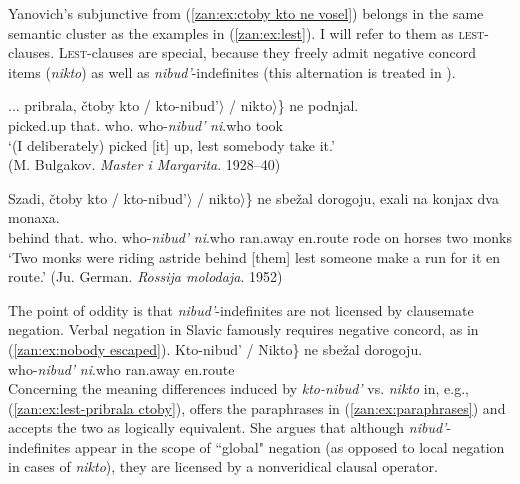 \documentclass[output=paper,colorlinks,citecolor=brown]{langscibook}
\begin{document}
Yanovich's subjunctive from (\ref{zan:ex:ctoby kto ne vosel}) belongs in the same semantic cluster as the examples in (\ref{zan:ex:lest}). I will refer to them as \textsc{lest}-clauses. \textsc{Lest}-clauses are special, because they freely admit negative concord items (\textit{nikto}) as well as \textit{nibud'}-inde\-finites (this alternation is treated in \citealt{paducheva2016}).


\ea \label{zan:ex:lest}
\ea \label{zan:ex:lest-pribrala ctoby}
 \gll ... pribrala,	čtoby	\minsp{\{} kto	 / \minsp{$\langle$}  kto-nibud'$\rangle$ / \minsp{$\langle$}  nikto$\rangle$\} ne	podnjal.  \\
       {}	picked.up	that.{\SBJV} {} who.{\INDF} {} {} {} who-\textit{nibud'} {} {} {} \textit{ni}.who	{\NEG}	took \\
        \glt `(I deliberately) picked [it] up, lest somebody take it.'\\ \hfill {(M. Bulgakov. \textit{Master i Margarita}. 1928--40)}
 
  \ex
  \gll 	Szadi,	čtoby	\minsp{\{} kto / \minsp{$\langle$}  kto-nibud'$\rangle$ / \minsp{$\langle$}  nikto$\rangle$\}	ne	sbežal	dorogoju,	exali	na	konjax dva	monaxa.  \\
        behind	that.{\SBJV} {}	who.{\INDF} {} {} {} who-\textit{nibud'} {} {} {} \textit{ni}.who	{\NEG}	ran.away	en.route	rode	on	horses
two	monks \\
        \glt `Two monks were riding astride behind [them] lest someone make a run for it en route.' \hfill {(Ju. German. \textit{Rossija molodaja}. 1952)}
       
\z\z

\noindent The point of oddity is that \textit{nibud'}-indefinites are not licensed by clausemate negation. Verbal negation in Slavic famously requires negative concord, as in (\ref{zan:ex:nobody escaped}).  
        \ea \label{zan:ex:nobody escaped}
        \gll \minsp{*\{} Kto-nibud' /  Nikto\}	ne	sbežal	dorogoju.\\
        {} who-\textit{nibud'} {} {} \textit{ni}.who    {\NEG} ran.away en.route\\
        \z
\noindent Concerning the meaning differences induced by \textit{kto-nibud'} vs. \textit{nikto} in, e.g., (\ref{zan:ex:lest-pribrala ctoby}), \citeauthor{paducheva2016} offers the paraphrases in (\ref{zan:ex:paraphrases}) and accepts the two as logically equivalent. She argues that although \textit{nibud'}-indefinites appear in the scope of ``global" negation (as opposed to local negation in cases of \textit{nikto}), they are licensed by a nonveridical clausal operator. 
\end{document}
